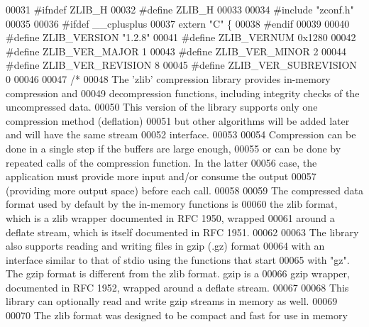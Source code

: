 \begin{DoxyCode}
00031 \textcolor{preprocessor}{#ifndef ZLIB\_H}
00032 \textcolor{preprocessor}{#define ZLIB\_H}
00033 
00034 \textcolor{preprocessor}{#include "zconf.h"}
00035 
00036 \textcolor{preprocessor}{#ifdef \_\_cplusplus}
00037 \textcolor{keyword}{extern} \textcolor{stringliteral}{"C"} \{
00038 \textcolor{preprocessor}{#endif}
00039 
00040 \textcolor{preprocessor}{#define ZLIB\_VERSION "1.2.8"}
00041 \textcolor{preprocessor}{#define ZLIB\_VERNUM 0x1280}
00042 \textcolor{preprocessor}{#define ZLIB\_VER\_MAJOR 1}
00043 \textcolor{preprocessor}{#define ZLIB\_VER\_MINOR 2}
00044 \textcolor{preprocessor}{#define ZLIB\_VER\_REVISION 8}
00045 \textcolor{preprocessor}{#define ZLIB\_VER\_SUBREVISION 0}
00046 
00047 \textcolor{comment}{/*}
00048 \textcolor{comment}{    The 'zlib' compression library provides in-memory compression and}
00049 \textcolor{comment}{  decompression functions, including integrity checks of the uncompressed data.}
00050 \textcolor{comment}{  This version of the library supports only one compression method (deflation)}
00051 \textcolor{comment}{  but other algorithms will be added later and will have the same stream}
00052 \textcolor{comment}{  interface.}
00053 \textcolor{comment}{}
00054 \textcolor{comment}{    Compression can be done in a single step if the buffers are large enough,}
00055 \textcolor{comment}{  or can be done by repeated calls of the compression function.  In the latter}
00056 \textcolor{comment}{  case, the application must provide more input and/or consume the output}
00057 \textcolor{comment}{  (providing more output space) before each call.}
00058 \textcolor{comment}{}
00059 \textcolor{comment}{    The compressed data format used by default by the in-memory functions is}
00060 \textcolor{comment}{  the zlib format, which is a zlib wrapper documented in RFC 1950, wrapped}
00061 \textcolor{comment}{  around a deflate stream, which is itself documented in RFC 1951.}
00062 \textcolor{comment}{}
00063 \textcolor{comment}{    The library also supports reading and writing files in gzip (.gz) format}
00064 \textcolor{comment}{  with an interface similar to that of stdio using the functions that start}
00065 \textcolor{comment}{  with "gz".  The gzip format is different from the zlib format.  gzip is a}
00066 \textcolor{comment}{  gzip wrapper, documented in RFC 1952, wrapped around a deflate stream.}
00067 \textcolor{comment}{}
00068 \textcolor{comment}{    This library can optionally read and write gzip streams in memory as well.}
00069 \textcolor{comment}{}
00070 \textcolor{comment}{    The zlib format was designed to be compact and fast for use in memory}

\end{DoxyCode}
